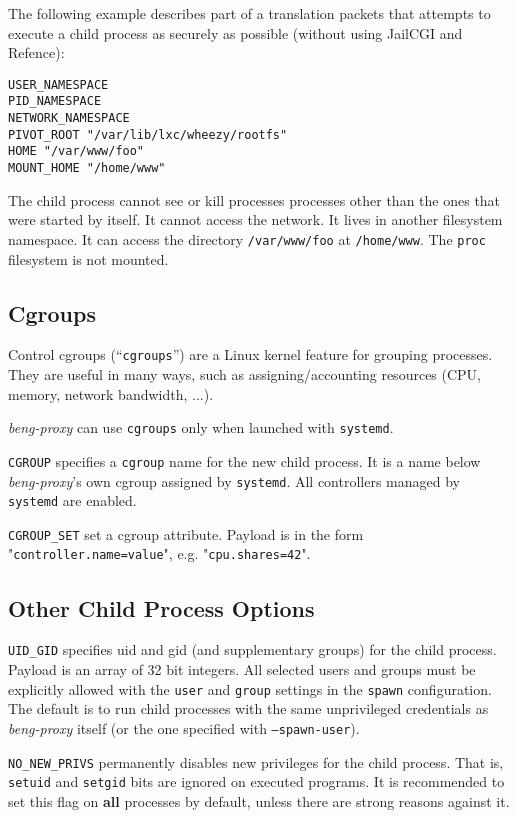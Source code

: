 \documentclass[a4paper,12pt]{article}
\begin{document}
The following example describes part of a translation packets that
attempts to execute a child process as securely as possible (without
using JailCGI and Refence):

\begin{verbatim}
USER_NAMESPACE
PID_NAMESPACE
NETWORK_NAMESPACE
PIVOT_ROOT "/var/lib/lxc/wheezy/rootfs"
HOME "/var/www/foo"
MOUNT_HOME "/home/www"
\end{verbatim}

The child process cannot see or kill processes processes other than
the ones that were started by itself.  It cannot access the network.
It lives in another filesystem namespace.  It can access the directory
\texttt{/var/www/foo} at \texttt{/home/www}.  The \texttt{proc}
filesystem is not mounted.

\subsection{Cgroups}
\label{cgroups}

Control cgroups (``\texttt{cgroups}'') are a Linux kernel feature for
grouping processes.  They are useful in many ways, such as
assigning/accounting resources (CPU, memory, network bandwidth, ...).

\emph{beng-proxy} can use \texttt{cgroups} only when launched with
\texttt{systemd}.

\verb|CGROUP| specifies a \texttt{cgroup} name for the new child
process.  It is a name below \emph{beng-proxy}'s own cgroup assigned
by \texttt{systemd}.  All controllers managed by \texttt{systemd} are
enabled.

\verb|CGROUP_SET| set a cgroup attribute.  Payload is in the form
"\texttt{controller.name=value}", e.g. "\texttt{cpu.shares=42}".

\subsection{Other Child Process Options}
\label{childoptions}

\verb|UID_GID| specifies uid and gid (and supplementary groups) for
the child process.  Payload is an array of 32 bit integers.  All
selected users and groups must be explicitly allowed with the
\texttt{user} and \texttt{group} settings in the \texttt{spawn}
configuration.
The default is to run child processes with the same unprivileged
credentials as \emph{beng-proxy} itself (or the one specified with
\texttt{--spawn-user}).

\verb|NO_NEW_PRIVS| permanently disables new privileges for the child
process.  That is, \texttt{setuid} and \texttt{setgid} bits are
ignored on executed programs.  It is recommended to set this flag on
\textbf{all} processes by default, unless there are strong reasons
against it.
\end{document}
